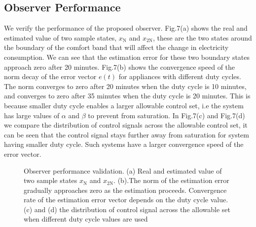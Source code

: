 \documentclass[journal]{IEEEtran}
\begin{document}
\subsection{Observer Performance}
We verify the performance of the proposed observer. Fig.7(a) shows the real and estimated value of two sample states, $x_{\textrm{N}}$ and $x_{\textrm{2N}}$, these are the two states around the boundary of the comfort band that will affect the change in electricity consumption. We can see that the estimation error for these two boundary states approach zero after 20 minutes. Fig.7(b) shows the convergence speed of the norm decay of the error vector $e(t)$ for appliances with different duty cycles. The norm converges to zero after 20 minutes when the duty cycle is 10 minutes, and converges to zero after 35 minutes when the duty cycle is 20 minutes. This is because smaller duty cycle enables a larger allowable control set, i.e the system has large values of $\alpha$ and $\beta$ to prevent from saturation. In Fig.7(c) and Fig.7(d) we compare the distribution of control signals across the allowable control set, it can be seen that the control signal stays further away from saturation for system having smaller duty cycle. Such systems have a larger convergence speed of the error vector. \begin{figure}[hbt]
\centering
{}
\label{observer_result}
\caption{Observer performance validation. (a) Real and estimated value of two sample states $x_{\textrm{N}}$ and $x_{\textrm{2N}}$. (b).The norm of the estimation error gradually approaches zero as the estimation proceeds. Convergence rate of the estimation error vector depends on the duty cycle value. (c) and (d) the distribution of control signal across the allowable set when different duty cycle values are used}
\end{figure}
\end{document}
